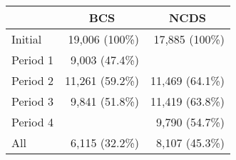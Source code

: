 
\begin{tabular}{lrr}
\toprule
  & \multicolumn{1}{c}{BCS} & \multicolumn{1}{c}{NCDS}\\
\midrule
Initial & 19,006 (100\%) & 17,885 (100\%)\\
\midrule
Period 1 & 9,003 (47.4\%) & \\
Period 2 & 11,261 (59.2\%) & 11,469 (64.1\%)\\
Period 3 & 9,841 (51.8\%) & 11,419 (63.8\%)\\
Period 4 &  & 9,790 (54.7\%)\\
\midrule
All & 6,115 (32.2\%) & 8,107 (45.3\%)\\
\bottomrule
\end{tabular}
